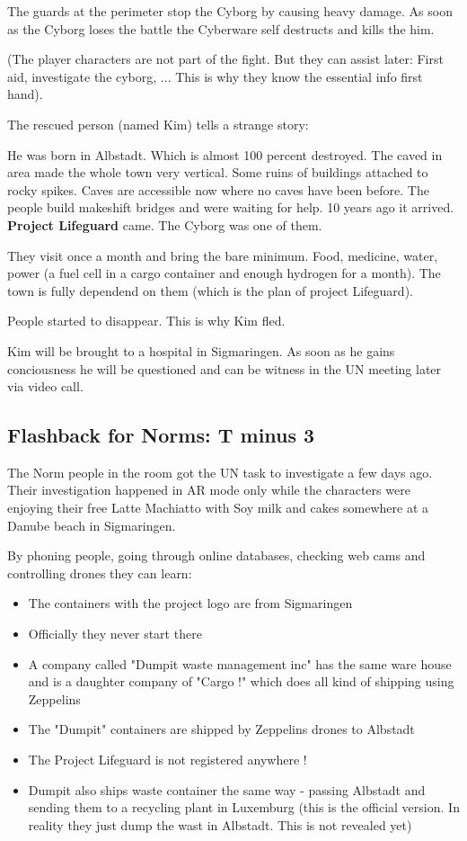 The guards at the perimeter stop the Cyborg by causing heavy damage. As soon as the Cyborg loses the battle the Cyberware self destructs and kills the him.

(The player characters are not part of the fight. But they can assist later: First aid, investigate the cyborg, ... This is why they know the essential info first hand).

The rescued person (named Kim) tells a strange story:

He was born in Albstadt. Which is almost 100 percent destroyed. The caved in area made the whole town very vertical. Some ruins of buildings attached to rocky spikes. Caves are accessible now where no caves have been before. The people build makeshift bridges and were waiting for help. 10 years ago it arrived. \textbf{Project Lifeguard} came. The Cyborg was one of them.

They visit once a month and bring the bare minimum. Food, medicine, water, power (a fuel cell in a cargo container and enough hydrogen for a month). The town is fully dependend on them (which is the plan of project Lifeguard).

People started to disappear. This is why Kim fled.

Kim will be brought to a hospital in Sigmaringen. As soon as he gains conciousness he will be questioned and can be witness in the UN meeting later via video call.

\subsection{Flashback for Norms: T minus 3}

The Norm people in the room got the UN task to investigate a few days ago. Their investigation happened in AR mode only while the characters were enjoying their free Latte Machiatto with Soy milk and cakes somewhere at a Danube beach in Sigmaringen.

By phoning people, going through online databases, checking web cams and controlling drones they can learn:

\begin{itemize}
    \item The containers with the project logo are from Sigmaringen
    \item Officially they never start there
    \item A company called "Dumpit waste management inc" has the same ware house and is a daughter company of "Cargo !" which does all kind of shipping using Zeppelins
    \item The "Dumpit" containers are shipped by Zeppelins drones to Albstadt
    \item The Project Lifeguard is not registered anywhere !
    \item Dumpit also ships waste container the same way - passing Albstadt and sending them to a recycling plant in Luxemburg (this is the official version. In reality they just dump the wast in Albstadt. This is not revealed yet)
\end{itemize}

